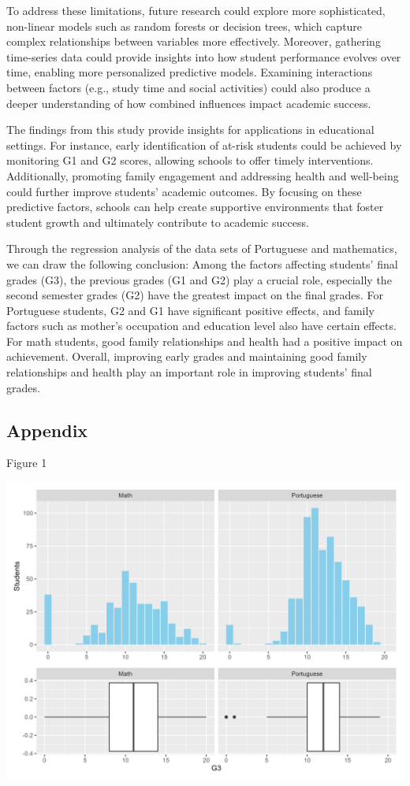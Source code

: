 \documentclass[letterpaper,9pt,twocolumn,twoside,]{pinp}
\begin{document}
To address these limitations, future research could explore more
sophisticated, non-linear models such as random forests or decision
trees, which capture complex relationships between variables more
effectively. Moreover, gathering time-series data could provide insights
into how student performance evolves over time, enabling more
personalized predictive models. Examining interactions between factors
(e.g., study time and social activities) could also produce a deeper
understanding of how combined influences impact academic success.

The findings from this study provide insights for applications in
educational settings. For instance, early identification of at-risk
students could be achieved by monitoring G1 and G2 scores, allowing
schools to offer timely interventions. Additionally, promoting family
engagement and addressing health and well-being could further improve
students' academic outcomes. By focusing on these predictive factors,
schools can help create supportive environments that foster student
growth and ultimately contribute to academic success.

Through the regression analysis of the data sets of Portuguese and
mathematics, we can draw the following conclusion: Among the factors
affecting students' final grades (G3), the previous grades (G1 and G2)
play a crucial role, especially the second semester grades (G2) have the
greatest impact on the final grades. For Portuguese students, G2 and G1
have significant positive effects, and family factors such as mother's
occupation and education level also have certain effects. For math
students, good family relationships and health had a positive impact on
achievement. Overall, improving early grades and maintaining good family
relationships and health play an important role in improving students'
final grades.

\clearpage

\subsection{Appendix}\label{appendix}

Figure 1

\begin{center}\includegraphics[width=1\linewidth]{combined_plot} \end{center}
\end{document}
